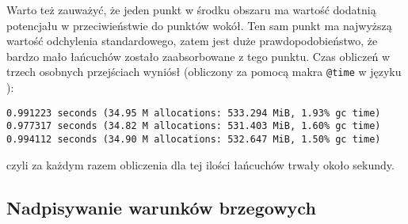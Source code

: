 \documentclass[a4paper, 12pt]{article}
\begin{document}
	Warto też zauważyć, że jeden punkt w środku obszaru ma wartość dodatnią potencjału w przeciwieństwie do punktów wokół.
	Ten sam punkt ma najwyższą wartość odchylenia standardowego, zatem jest duże prawdopodobieństwo, że bardzo mało łańcuchów zostało zaabsorbowane z tego punktu.
	Czas obliczeń w trzech osobnych przejściach wyniósł (obliczony za pomocą makra \texttt{@time} w języku \julia):
	\begin{verbatim}
0.991223 seconds (34.95 M allocations: 533.294 MiB, 1.93% gc time)
0.977317 seconds (34.82 M allocations: 531.403 MiB, 1.60% gc time)
0.994112 seconds (34.90 M allocations: 532.647 MiB, 1.50% gc time)
	\end{verbatim}
	czyli za każdym razem obliczenia dla tej ilości łańcuchów trwały około sekundy.
	
	\subsection*{Nadpisywanie warunków brzegowych}
	
\end{document}
